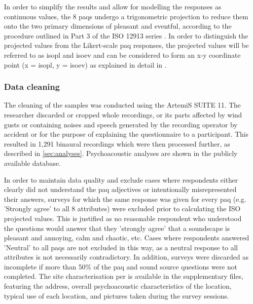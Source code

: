    In order to simplify the results and allow for modelling the responses as continuous values, the 8 \glspl{paq} undergo a trigonometric projection to reduce them onto the two primary dimensions of pleasant and eventful, according to the procedure outlined in Part 3 of the ISO 12913 series \citep{ISO12913Part3}. In order to distinguish the projected values from the Likert-scale \gls{paq} responses, the projected values will be referred to as \gls{isopl} and \gls{isoev} and can be considered to form an x-y coordinate point (x = \gls{isopl}, y = \gls{isoev}) as explained in detail in \citet{Lionello2021Introducing}.


   \subsubsection{Data cleaning}
   The cleaning of the samples was conducted using the ArtemiS SUITE 11. The researcher discarded or cropped whole recordings, or its parts affected by wind gusts or containing noises and speech generated by the recording operator by accident or for the purpose of explaining the questionnaire to a participant. This resulted in 1,291 binaural recordings which were then processed further, as described in \cref{sec:analyses}. Psychoacoustic analyses are shown in the publicly available database.

   In order to maintain data quality and exclude cases where respondents either clearly did not understand the \gls{paq} adjectives or intentionally misrepresented their answers, surveys for which the same response was given for every \gls{paq} (e.g. 'Strongly agree' to all 8 attributes) were excluded prior to calculating the ISO projected values. This is justified as no reasonable respondent who understood the questions would answer that they 'strongly agree' that a soundscape is pleasant and annoying, calm and chaotic, etc. Cases where respondents answered 'Neutral' to all \glspl{paq} are not excluded in this way, as a neutral response to all attributes is not necessarily contradictory. In addition, surveys were discarded as incomplete if more than 50\% of the \gls{paq} and sound source questions were not completed. The site characterisation per \citet{ISO12913Part2} is available in the supplementary files, featuring the address, overall psychoacoustic characteristics of the location, typical use of each location, and pictures taken during the survey sessions.

